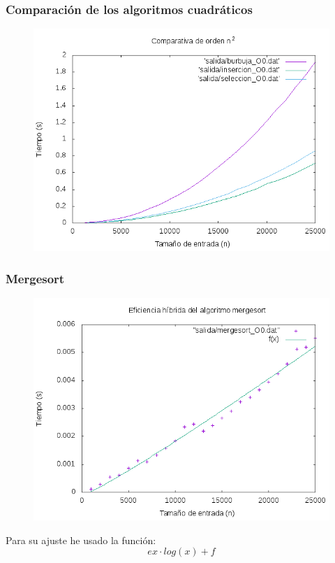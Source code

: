 \documentclass[spanish]{beamer}
\begin{document}
\begin{frame}\frametitle{Comparación de los algoritmos cuadráticos}
  \begin{figure}[H]
    \centering   
        \includegraphics[clip,width=1\columnwidth]{../../plots/cuadraticos_O0.png}%
    \end{figure}
  \end{frame}

 \begin{frame}\frametitle{Mergesort}
    \begin{figure}[H]
    \centering   
    \includegraphics[clip,width=0.76\columnwidth]{../../plots/mergesort_O0_fit.png}%
    \end{figure}

    Para su ajuste he usado la función: $$ex\cdot log(x)+f$$
       
  \end{frame}
\end{document}
